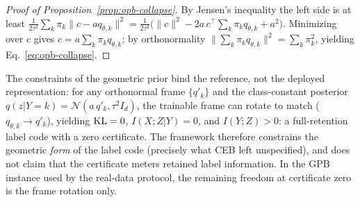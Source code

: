 \begin{proof}[Proof of Proposition~\ref{prop:opb-collapse}]
By Jensen's inequality the left side is at least
$\tfrac{1}{2\tau^2}\sum_k \pi_k \|c - a q_{\theta,k}\|^2
= \tfrac{1}{2\tau^2}\bigl(\|c\|^2 - 2a\,c^{\top}\!\sum_k\pi_k q_{\theta,k} + a^2\bigr)$.
Minimizing over $c$ gives $c = a\sum_k\pi_k q_{\theta,k}$; by orthonormality
$\|\sum_k\pi_k q_{\theta,k}\|^2 = \sum_k \pi_k^2$, yielding Eq.~\eqref{eq:opb-collapse}.
\end{proof}

\begin{remark}
\label{rem:counterexample}
The constraints of the geometric prior bind the reference, not the deployed
representation: for any orthonormal frame $\{q'_k\}$ and the class-constant posterior
$q(z|Y=k) = \mathcal{N}(a\,q'_k, \tau^2 I_d)$, the trainable frame can rotate
to match ($q_{\theta,k} \to q'_k$), yielding $\operatorname{KL} = 0$, $I(X;Z|Y) = 0$, and
$I(Y;Z) > 0$: a full-retention label code with a zero certificate. The framework
therefore constrains the geometric \emph{form} of the label code (precisely what CEB
left unspecified), and does not claim that the certificate meters retained label
information. In the GPB instance used by the real-data protocol, the remaining
freedom at certificate zero is the frame rotation only.
\end{remark}

